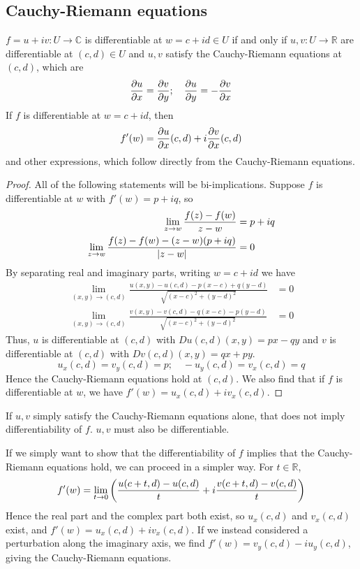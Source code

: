 \subsection{Cauchy-Riemann equations}
\begin{theorem}
	\( f = u + iv \colon U \to \mathbb C \) is differentiable at \( w = c + id \in U \) if and only if \( u,v \colon U \to \mathbb R \) are differentiable at \( (c,d) \in U \) and \( u,v \) satisfy the Cauchy-Riemann equations at \( (c,d) \), which are
	\[ \pdv{u}{x} = \pdv{v}{y};\quad \pdv{u}{y} = -\pdv{v}{x} \]
	If \( f \) is differentiable at \( w = c + id \), then
	\[ f'(w) = \pdv{u}{x}\qty(c,d) + i \pdv{v}{x}\qty(c,d) \]
	and other expressions, which follow directly from the Cauchy-Riemann equations.
\end{theorem}
\begin{proof}
	All of the following statements will be bi-implications.
	Suppose \( f \) is differentiable at \( w \) with \( f'(w) = p+iq \), so
	\begin{align*}
		\lim_{z \to w} \frac{f(z) - f(w)}{z-w} &= p+iq \\
		\lim_{z \to w} \frac{f(z) - f(w) - (z-w)(p+iq)}{\abs{z-w}} &= 0
	\end{align*}
	By separating real and imaginary parts, writing \( w = c + id \) we have
	\begin{align*}
		\lim_{(x,y) \to (c,d)} \frac{u(x,y) - u(c,d) - p(x-c) + q(y-d)}{\sqrt{(x-c)^2 + (y-d)^2}} &= 0 \\
		\lim_{(x,y) \to (c,d)} \frac{v(x,y) - v(c,d) - q(x-c) - p(y-d)}{\sqrt{(x-c)^2 + (y-d)^2}} &= 0
	\end{align*}
	Thus, \( u \) is differentiable at \( (c,d) \) with \( Du(c,d)(x,y) = px - qy \) and \( v \) is differentiable at \( (c,d) \) with \( Dv(c,d)(x,y) = qx + py \).
	\[ u_x(c,d) = v_y(c,d) = p;\quad -u_y(c,d) = v_x(c,d) = q \]
	Hence the Cauchy-Riemann equations hold at \( (c,d) \).
	We also find that if \( f \) is differentiable at \( w \), we have \( f'(w) = u_x(c,d) + i v_x(c,d) \).
\end{proof}
\begin{remark}
	If \( u,v \) simply satisfy the Cauchy-Riemann equations alone, that does not imply differentiability of \( f \).
	\( u,v \) must also be differentiable.
\end{remark}
\begin{remark}
	If we simply want to show that the differentiability of \( f \) implies that the Cauchy-Riemann equations hold, we can proceed in a simpler way.
	For \( t \in \mathbb R \),
	\[ f'(w) = \lim_{t \to 0} \qty(\frac{u(c+t,d) - u(c,d)}{t} + i \frac{v(c+t,d) - v(c,d)}{t}) \]
	Hence the real part and the complex part both exist, so \( u_x(c,d) \) and \( v_x(c,d) \) exist, and \( f'(w) = u_x(c,d) + i v_x(c,d) \).
	If we instead considered a perturbation along the imaginary axis, we find \( f'(w) = v_y(c,d) - iu_y(c,d) \), giving the Cauchy-Riemann equations.
\end{remark}
